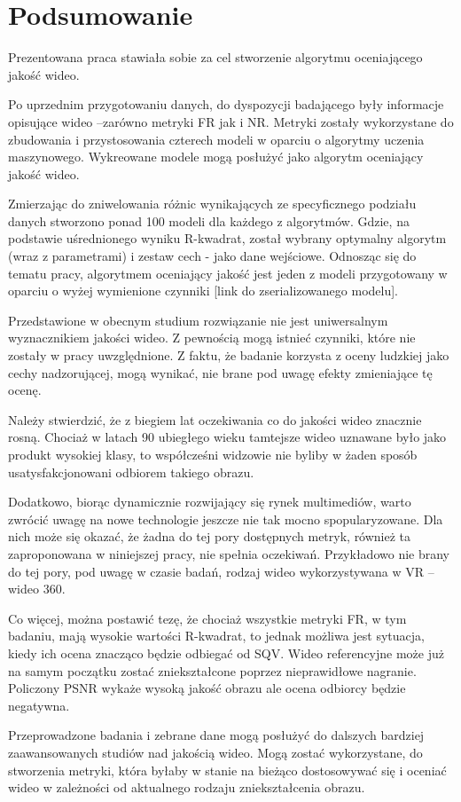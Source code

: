 \chapter{Podsumowanie}




Prezentowana praca stawiała sobie za cel stworzenie algorytmu oceniającego jakość wideo.

Po uprzednim przygotowaniu danych, do dyspozycji badającego były informacje opisujące wideo –zarówno metryki FR jak i NR. Metryki zostały wykorzystane do zbudowania i przystosowania czterech modeli w oparciu o algorytmy uczenia maszynowego. Wykreowane modele mogą posłużyć jako algorytm oceniający jakość wideo.

Zmierzając do zniwelowania różnic wynikających ze specyficznego podziału danych stworzono ponad 100 modeli dla każdego z algorytmów. Gdzie, na podstawie uśrednionego wyniku R-kwadrat, został wybrany optymalny algorytm (wraz z parametrami) i zestaw cech - jako dane wejściowe. Odnosząc się do tematu pracy, algorytmem oceniający jakość jest jeden z modeli przygotowany w oparciu o wyżej wymienione czynniki [link do zserializowanego modelu].

Przedstawione w obecnym studium rozwiązanie nie jest uniwersalnym wyznacznikiem jakości wideo. Z pewnością mogą istnieć czynniki, które nie zostały w pracy uwzględnione. Z faktu, że badanie korzysta z oceny ludzkiej jako cechy nadzorującej, mogą wynikać, nie brane pod uwagę efekty zmieniające tę ocenę.

Należy stwierdzić, że z biegiem lat oczekiwania co do jakości wideo znacznie rosną. Chociaż w latach 90 ubiegłego wieku tamtejsze wideo uznawane było jako produkt wysokiej klasy, to współcześni widzowie nie byliby w żaden sposób usatysfakcjonowani odbiorem takiego obrazu. 

Dodatkowo, biorąc dynamicznie rozwijający się rynek multimediów, warto zwrócić uwagę na nowe technologie jeszcze nie tak mocno spopularyzowane. Dla nich może się okazać, że żadna do tej pory dostępnych metryk, również ta  zaproponowana w niniejszej pracy,  nie spełnia oczekiwań. Przykładowo nie brany do tej pory, pod uwagę w czasie badań, rodzaj wideo wykorzystywana w VR -- wideo 360.  

Co więcej, można postawić tezę, że chociaż wszystkie metryki FR, w tym badaniu, mają wysokie wartości R-kwadrat, to jednak możliwa jest sytuacja, kiedy ich ocena znacząco będzie odbiegać od SQV. Wideo referencyjne może już na samym początku zostać zniekształcone poprzez nieprawidłowe nagranie. Policzony PSNR wykaże wysoką jakość obrazu ale ocena odbiorcy będzie negatywna.

Przeprowadzone badania i zebrane dane mogą posłużyć do dalszych bardziej
zaawansowanych studiów nad jakością wideo. Mogą zostać wykorzystane, do stworzenia metryki, która byłaby w stanie na bieżąco dostosowywać się i oceniać wideo w zależności od aktualnego rodzaju zniekształcenia obrazu.


\label{cha:pierwszyDokument}









